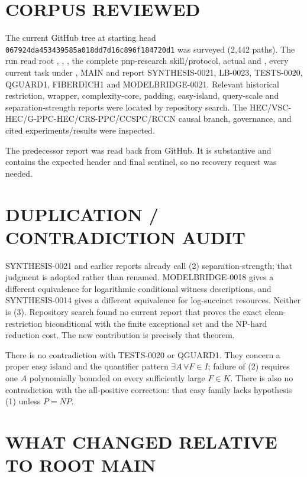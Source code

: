 \documentclass[11pt]{article}
\begin{document}
\section{CORPUS REVIEWED}

The current GitHub tree at starting head
\texttt{067924da453439585a018dd7d16c896f184720d1} was surveyed (2,442 paths).
The run read root , , , the
complete pnp-research skill/protocol, actual  and
, every current task under , MAIN and report
SYNTHESIS-0021, LB-0023, TESTS-0020, QGUARD1, FIBERDICH1 and
MODELBRIDGE-0021.  Relevant historical restriction, wrapper, complexity-core,
padding, easy-island, query-scale and separation-strength reports were
located by repository search.  The HEC/VSC-HEC/G-PPC-HEC/CRS-PPC/CCSPC/RCCN
causal branch, governance, and cited experiments/results were inspected.

The predecessor report
 was read back
from GitHub.  It is substantive and contains the expected header and final
sentinel, so no recovery request was needed.

\section{DUPLICATION / CONTRADICTION AUDIT}

SYNTHESIS-0021 and earlier reports already call (2) separation-strength;
that judgment is adopted rather than renamed.  MODELBRIDGE-0018 gives a
different equivalence for logarithmic conditional witness descriptions, and
SYNTHESIS-0014 gives a different equivalence for log-succinct resources.
Neither is (3).  Repository search found no current report that proves the
exact clean-restriction biconditional with the finite exceptional set and the
NP-hard reduction cost.  The new contribution is precisely that theorem.

There is no contradiction with TESTS-0020 or QGUARD1.  They concern a proper
easy island and the quantifier pattern $\exists A\,\forall F\in I$; failure
of (2) requires one $A$ polynomially bounded on every sufficiently large
$F\in K$.  There is also no contradiction with the all-positive correction:
that easy family lacks hypothesis (1) unless $P=NP$.

\section{WHAT CHANGED RELATIVE TO ROOT MAIN}
\end{document}
